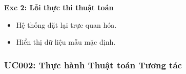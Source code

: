 \begin{usecase}
{\textbf{Exc 2: Lỗi thực thi thuật toán}
\begin{itemize}
    \item Hệ thống đặt lại trực quan hóa.
    \item Hiển thị dữ liệu mẫu mặc định.
\end{itemize}}
\end{usecase}

\subsubsection{UC002: Thực hành Thuật toán Tương tác}

